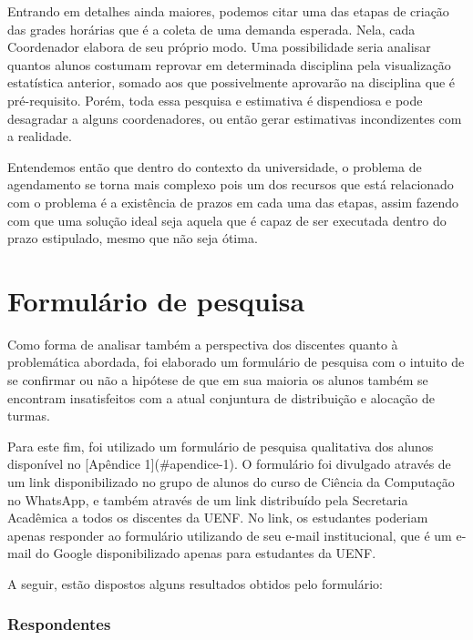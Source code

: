     Entrando em detalhes ainda maiores, podemos citar uma das etapas de criação das grades horárias que é a coleta de uma demanda esperada. Nela, cada Coordenador elabora de seu próprio modo. Uma possibilidade seria analisar quantos alunos costumam reprovar em determinada disciplina pela visualização estatística anterior, somado aos que possivelmente aprovarão na disciplina que é pré-requisito. Porém, toda essa pesquisa e estimativa é dispendiosa e pode desagradar a alguns coordenadores, ou então gerar estimativas incondizentes com a realidade.

    Entendemos então que dentro do contexto da universidade, o problema de agendamento se torna mais complexo pois um dos recursos que está relacionado com o problema é a existência de prazos em cada uma das etapas, assim fazendo com que uma solução ideal seja aquela que é capaz de ser executada dentro do prazo estipulado, mesmo que não seja ótima.

\section{Formulário de pesquisa} %


    Como forma de analisar também a perspectiva dos discentes quanto à problemática abordada, foi elaborado um formulário de pesquisa com o intuito de se confirmar ou não a hipótese de que em sua maioria os alunos também se encontram insatisfeitos com a atual conjuntura de distribuição e alocação de turmas.

    Para este fim, foi utilizado um formulário de pesquisa qualitativa dos alunos disponível no [Apêndice 1](#apendice-1). O formulário foi divulgado através de um link disponibilizado no grupo de alunos do curso de Ciência da Computação no WhatsApp, e também através de um link distribuído pela Secretaria Acadêmica a todos os discentes da UENF. No link, os estudantes poderiam apenas responder ao formulário utilizando de seu e-mail institucional, que é um e-mail do Google disponibilizado apenas para estudantes da UENF.

    A seguir, estão dispostos alguns resultados obtidos pelo formulário:


    \subsubsection{Respondentes} %


